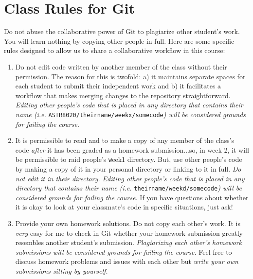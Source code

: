 \documentclass[12pt, letterpaper]{article}
\newcommand{\code}{\texttt}
\begin{document}
\hypertarget{refbkmk8}{}
\section*{Class Rules for Git}
Do not abuse the collaborative power of Git to plagiarize other student's work.  You will learn nothing by copying other people in full.  Here are some specific rules designed to allow us to share a collaborative workflow in this course:

\begin{enumerate}
\item Do not edit code written by another member of the class without their permission.  The reason for this is twofold: a) it maintains separate spaces for each student to submit their independent work and b) it facilitates a workflow that makes merging changes to the repository straightforward.  {\it Editing other people's code that is placed in any directory that contains their name (i.e. }\code{ASTR8020/theirname/weekx/somecode}{\it) will be considered grounds for failing the course.}
\item It is permissible to read and to make a copy of any member of the class's code {\it after} it has been graded as a homework submission...so, in week 2, it will be permissible to raid people's {\code week1} directory.  But, use other people's code by making a copy of it in your personal directory or linking to it in full.  {\it Do not edit it in their directory.  Editing other people's code that is placed in any directory that contains their name (i.e. }\code{theirname/weekd/somecode}{\it ) will be considered grounds for failing the course.} If you have questions about whether it is okay to look at your classmate's code in specific situations, just ask!
\item Provide your own homework solutions.  Do not copy each other's work.  It is {\it very} easy for me to check in Git whether your homework submission greatly resembles another student's submission.  {\it Plagiarizing each other's homework submissions will be considered grounds for failing the course.} Feel free to discuss homework problems and issues with each other but {\it write your own submissions sitting by yourself.}
\end{enumerate}


\label{lastpage}
\end{document}
